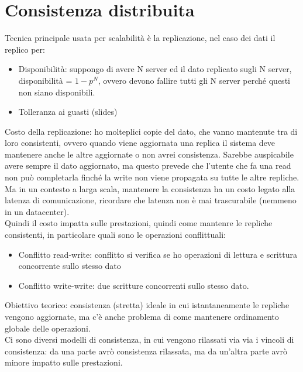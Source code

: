 \documentclass[16px]{article}
\begin{document}
\section{Consistenza distribuita}
Tecnica principale usata per scalabilità è la replicazione, nel caso dei dati il replico per:
\begin{itemize} 
\item Disponibilità: suppongo di avere N server ed il dato replicato sugli N server, disponibilità = $1-p^N$, ovvero devono fallire tutti gli N server perché questi non siano disponibili.
\item Tolleranza ai guasti (slides)
\end{itemize}
Costo della replicazione: ho molteplici copie del dato, che vanno mantenute tra di loro consistenti, ovvero quando viene aggiornata una replica il sistema deve mantenere anche le altre aggiornate o non avrei consistenza. Sarebbe auspicabile avere sempre il dato aggiornato, ma questo prevede che l'utente che fa una read non può completarla finché la write non viene propagata su tutte le altre repliche. Ma in un contesto a larga scala, mantenere la consistenza ha un costo legato alla latenza di comunicazione, ricordare che latenza non è mai trascurabile (nemmeno in un datacenter).\\ Quindi il costo impatta sulle prestazioni, quindi come mantenre le repliche consistenti, in particolare quali sono le operazioni conflittuali:
\begin{itemize}
\item Conflitto read-write: conflitto si verifica se ho operazioni di lettura e scrittura concorrente sullo stesso dato
\item Conflitto write-write: due scritture concorrenti sullo stesso dato.
\end{itemize}
Obiettivo teorico: consistenza (stretta) ideale in cui istantaneamente le repliche vengono aggiornate, ma c'è anche problema di come mantenere ordinamento globale delle operazioni.\\ Ci sono diversi modelli di consistenza, in cui vengono rilassati via via i vincoli di consistenza: da una parte avrò consistenza rilassata, ma da un'altra parte avrò minore impatto sulle prestazioni.
\end{document}
